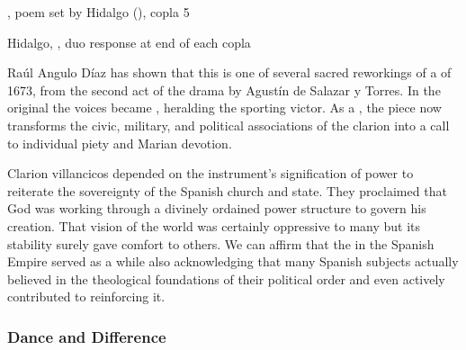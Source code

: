 \begin{poemexample}
    \caption{, poem set by Hidalgo
    (), copla 5}
    \label{poem:Venid_querubines_alados-Hidalgo}
\end{poemexample}

\begin{musicexample}
    \caption{Hidalgo, , duo response at end of
    each copla} 
    \label{mus:Hidalgo-Venid_querubines}
\end{musicexample}

Raúl Angulo Díaz has shown that this is one of several sacred reworkings of a
 of 1673,  from the second
act of the drama  by Agustín de Salazar y
Torres.%
    \autocite[25--35]{Hidalgo:Obras}
In the original the voices became ,  heralding the sporting victor.
As a , the piece now transforms the civic, military, and
political associations of the clarion into a call to individual piety and
Marian devotion.


Clarion villancicos depended on the instrument's signification of power to
reiterate the sovereignty of the Spanish church and state.
They proclaimed that God was working through a divinely ordained power
structure to govern his creation.
That vision of the world was certainly oppressive to many but its stability
surely gave comfort to others.
We can affirm that the  in the Spanish Empire served as
a  while also acknowledging that many Spanish
subjects actually believed in the theological foundations of their political
order and even actively contributed to reinforcing it.%
    \Autocites
    {Rodriguez:Villancico}
    {Sage:Instrumentum}


\subsubsection{Dance and Difference}

